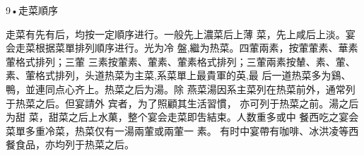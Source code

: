 9•走菜順序

走菜有先有后，均按一定順序进行。一般先上濃菜后上薄 菜，先上咸后上淡。宴会走菜根据菜單排列順序进行。光为冷 盤,繼为热菜。四葷兩素，按葷葷素、華素葷格式排列；三葷 三素按葷素、葷素、葷素格式排列；三葷兩素按輦、素、葷、 素、葷格式排列，头道热菜为主菜,系菜單上最貴軍的英,最 后一道热菜多为鷄、鴨，並連同点心齐上。热菜之后为湯。除 燕菜湯因系主菜列在热菜前外，通常列于热菜之后。但宴請外 宾者，为了照顧其生活習慣，
亦可列于热菜之前。湯之后为甜 菜，甜菜之后上水菓，整个宴会走菜即吿結束。人数重多或中 餐西吃之宴会菜單多重冷菜，热菜仅有一湯兩葷或兩葷一
素。 有时中宴帶有咖啡、冰洪凌等西餐食品，亦均列于热菜之后。
